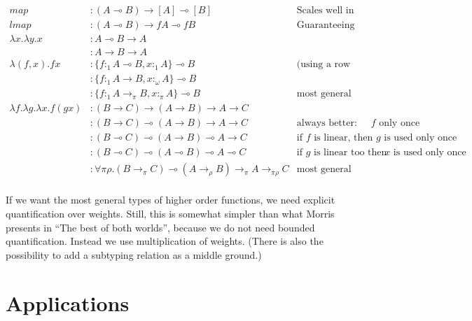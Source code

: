 \documentclass[11pt]{article}
\begin{document}
\hspace{-4cm}\begin{minipage}{\textwidth}
\begin{align*}
map & : (A ⊸ B) → [A] ⊸ [B] & \text{Scales well in unrestricted contexts}\\
lmap & : (A ⊸ B) → f A ⊸ f B & \text{Guaranteeing that no element is lost} \\
λx. λy. x & : A ⊸ B → A \\
          & : A → B → A \\
λ(f,x). f x & : \{f :_1 A ⊸ B, x :_1 A\} ⊸ B & \text{(using a row type for concision)}\\
            & : \{f :_1 A → B, x :_ω A\} ⊸ B \\
            & : \{f :_1 A →_π B, x :_π A\} ⊸ B & \text{most general type} \\
λf. λg. λx. f (g x) & : (B → C) → (A → B) → A → C \\
                    & : (B → C) ⊸ (A → B) → A → C & \text {always better: comp uses $f$  only once} \\
                    & : (B ⊸ C) ⊸ (A → B) ⊸ A → C & \text {if $f$ is linear, then $g$ is used only once} \\
                    & : (B ⊸ C) ⊸ (A ⊸ B) ⊸ A ⊸ C & \text {if $g$ is linear too then $x$ is used only once} \\
                    & : ∀ π ρ. (B →_π C) ⊸ (A →_ρ B) →_π A →_{πρ} C & \text{most general type} \\
\end{align*}
\end{minipage}


If we want the most general types of higher order functions, we need
explicit quantification over weights. Still, this is somewhat simpler
than what Morris presents in ``The best of both worlds'', because we
do not need bounded quantification. Instead we use multiplication of
weights. (There is also the possibility to add a subtyping relation as
a middle ground.)


\section{Applications}
\label{sec:ghc}
\end{document}
